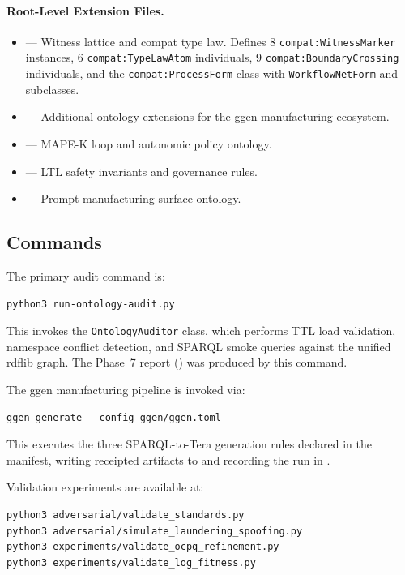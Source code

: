\paragraph{Root-Level Extension Files.}
\begin{itemize}
  \item {} --- Witness lattice and compat type law.
        Defines 8 \texttt{compat:WitnessMarker} instances, 6 \texttt{compat:TypeLawAtom}
        individuals, 9 \texttt{compat:BoundaryCrossing} individuals, and the
        \texttt{compat:ProcessForm} class with \texttt{WorkflowNetForm} and subclasses.
  \item {} --- Additional ontology extensions for
        the ggen manufacturing ecosystem.
  \item {} --- MAPE-K loop
        and autonomic policy ontology.
  \item {} --- LTL safety
        invariants and governance rules.
  \item {} ---
        Prompt manufacturing surface ontology.
\end{itemize}

\subsection{Commands}
\label{sec:research-open-ontologies-commands}

The primary audit command is:
\begin{verbatim}
python3 run-ontology-audit.py
\end{verbatim}
This invokes the \texttt{OntologyAuditor} class, which performs TTL load validation,
namespace conflict detection, and SPARQL smoke queries against the unified rdflib graph.
The Phase~7 report () was produced by this
command.

The ggen manufacturing pipeline is invoked via:
\begin{verbatim}
ggen generate --config ggen/ggen.toml
\end{verbatim}
This executes the three SPARQL-to-Tera generation rules declared in the manifest,
writing receipted artifacts to  and recording
the run in .

Validation experiments are available at:
\begin{verbatim}
python3 adversarial/validate_standards.py
python3 adversarial/simulate_laundering_spoofing.py
python3 experiments/validate_ocpq_refinement.py
python3 experiments/validate_log_fitness.py
\end{verbatim}

